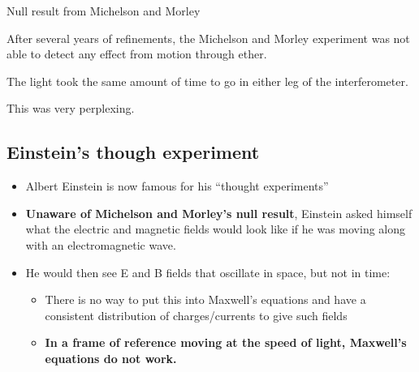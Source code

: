\documentclass[aspectratio=169,
hyperref={colorlinks,urlcolor=blue}
]{beamer}
\begin{document}
\begin{bulletframe}{Null result from Michelson and Morley}
\item After several years of refinements, the Michelson and Morley experiment was not able to detect any effect from motion through ether.
\item The light took the same amount of time to go in either leg of the interferometer.
\item This was very perplexing.
\end{bulletframe}


\subsection{Einstein's though experiment}
\label{subsec:einsteinsthoughexperiment}
{
\begin{itemize}
\item Albert Einstein is now famous for his ``thought experiments''
\item \textbf{Unaware of Michelson and Morley's null result}, Einstein asked himself what the electric and magnetic fields would look like if he was moving along with an electromagnetic wave.
\item He would then see E and B fields that oscillate in space, but not in time:
\begin{itemize}
\item There is no way to put this into Maxwell's equations and have a consistent distribution of charges/currents to give such fields
\item[$\rightarrow$] \textbf{In a frame of reference moving at the speed of light, Maxwell’s equations do not work.}
\end{itemize}
\end{itemize}
}
\end{document}
